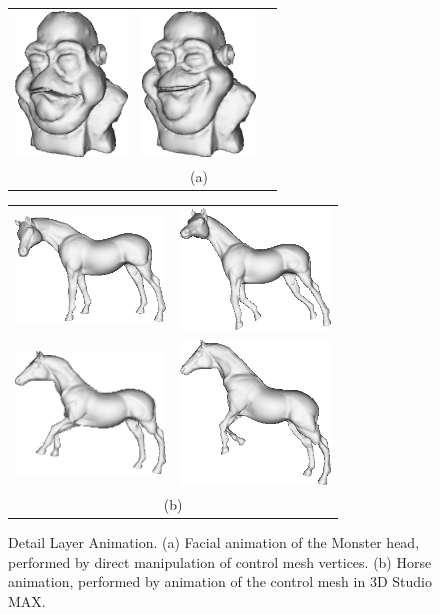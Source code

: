 \begin{figure}
\begin{center}
\begin{tabular}{ccc}
\includegraphics[width=3cm]{../images/mapanim_5} &
\includegraphics[width=3cm]{../images/mapanim_6} \\
& (a) &
\end{tabular}
\begin{tabular}{cc}
\includegraphics[width=4cm]{../images/horse_mapanim2} &
\includegraphics[width=4cm]{../images/horse_mapanim3} \\
\includegraphics[width=4cm]{../images/horse_mapanim4} &
\includegraphics[width=4cm]{../images/horse_mapanim5} \\
\multicolumn{2}{c}{(b)}
\end{tabular}
\caption[Detail Layer Animation]{\label{fig:detailanim} Detail Layer Animation. (a) Facial animation of the Monster head, performed by direct manipulation of control mesh vertices. (b) Horse animation, performed by animation of the control mesh in 3D Studio MAX.}
\end{center}
\end{figure}

